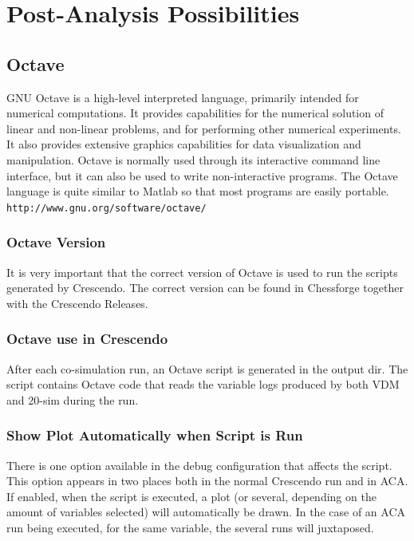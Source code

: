 \documentclass{crescendorepchap}
\newcommand{\url}[1]{\texttt{#1}}
\begin{document}
\chapter{Post-Analysis Possibilities}\label{chap:postana}

\section{Octave}\label{sec:octave}

GNU Octave is a high-level interpreted language, primarily intended for
numerical computations. It provides capabilities for the numerical
solution of linear and non-linear problems, and for performing other
numerical experiments. It also provides extensive graphics capabilities
for data visualization and manipulation. Octave is normally used through
its interactive command line interface, but it can also be used to write
non-interactive programs. The Octave language is quite similar to Matlab
so that most programs are easily portable.
\url{http://www.gnu.org/software/octave/}

\subsection{Octave Version}

It is very important that the correct version of Octave is used to run
the scripts generated by Crescendo. The correct version can be found in
Chessforge together with the Crescendo Releases.

\subsection{Octave use in Crescendo}

After each co-simulation run, an Octave script is generated in the
output dir. The script contains Octave code that reads the variable logs
produced by both VDM and 20-sim during the run.

\subsection{Show Plot Automatically when Script is Run}

There is one option available in the debug configuration that affects
the script. This option appears in two places both in the normal Crescendo
run and in ACA. If enabled, when the script is executed, a plot (or
several, depending on the amount of variables selected) will
automatically be drawn. In the case of an ACA run being executed, for
the same variable, the several runs will juxtaposed.
\end{document}

